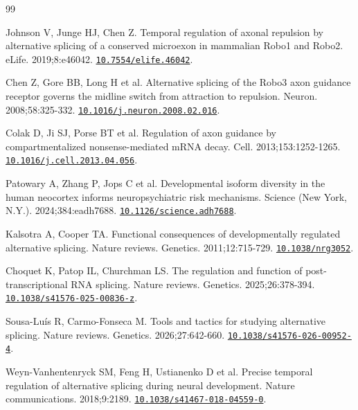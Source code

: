 \documentclass[11pt,a4paper]{article}
\begin{document}
\begin{thebibliography}{99}

\small

\setlength{\itemsep}{1.5pt}

Johnson V, Junge HJ, Chen Z. Temporal regulation of axonal repulsion by alternative splicing of a conserved microexon in mammalian Robo1 and Robo2. eLife. 2019;8:e46042. \href{https://doi.org/10.7554/elife.46042}{\nolinkurl{10.7554/elife.46042}}.

Chen Z, Gore BB, Long H et al. Alternative splicing of the Robo3 axon guidance receptor governs the midline switch from attraction to repulsion. Neuron. 2008;58:325-332. \href{https://doi.org/10.1016/j.neuron.2008.02.016}{\nolinkurl{10.1016/j.neuron.2008.02.016}}.

Colak D, Ji SJ, Porse BT et al. Regulation of axon guidance by compartmentalized nonsense-mediated mRNA decay. Cell. 2013;153:1252-1265. \href{https://doi.org/10.1016/j.cell.2013.04.056}{\nolinkurl{10.1016/j.cell.2013.04.056}}.

Patowary A, Zhang P, Jops C et al. Developmental isoform diversity in the human neocortex informs neuropsychiatric risk mechanisms. Science (New York, N.Y.). 2024;384:eadh7688. \href{https://doi.org/10.1126/science.adh7688}{\nolinkurl{10.1126/science.adh7688}}.

Kalsotra A, Cooper TA. Functional consequences of developmentally regulated alternative splicing. Nature reviews. Genetics. 2011;12:715-729. \href{https://doi.org/10.1038/nrg3052}{\nolinkurl{10.1038/nrg3052}}.

Choquet K, Patop IL, Churchman LS. The regulation and function of post-transcriptional RNA splicing. Nature reviews. Genetics. 2025;26:378-394. \href{https://doi.org/10.1038/s41576-025-00836-z}{\nolinkurl{10.1038/s41576-025-00836-z}}.

Sousa-Luís R, Carmo-Fonseca M. Tools and tactics for studying alternative splicing. Nature reviews. Genetics. 2026;27:642-660. \href{https://doi.org/10.1038/s41576-026-00952-4}{\nolinkurl{10.1038/s41576-026-00952-4}}.

Weyn-Vanhentenryck SM, Feng H, Ustianenko D et al. Precise temporal regulation of alternative splicing during neural development. Nature communications. 2018;9:2189. \href{https://doi.org/10.1038/s41467-018-04559-0}{\nolinkurl{10.1038/s41467-018-04559-0}}.


\end{thebibliography}
\end{document}
